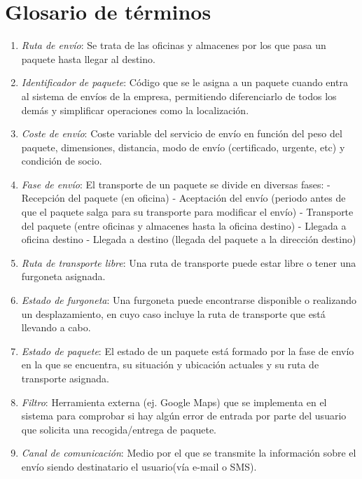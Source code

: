 \newpage

\section{Glosario de términos}
	\begin{enumerate}
		\item \textit{Ruta de envío}: Se trata de las oficinas y almacenes por los que pasa un paquete hasta llegar al destino.
		\item \textit{Identificador de paquete}: Código que se le asigna a un paquete cuando entra al sistema de envíos de la empresa, permitiendo diferenciarlo de todos los demás y simplificar operaciones como la localización.
		\item \textit{Coste de envío}: Coste variable del servicio de envío en función del peso del paquete, dimensiones, distancia, modo de envío (certificado, urgente, etc) y condición de socio.
		\item \textit{Fase de envío}: El transporte de un paquete se divide en diversas fases: \newline - Recepción del paquete (en oficina)
		\newline - Aceptación del envío (periodo antes de que el paquete salga para su transporte para modificar el envío)
		\newline - Transporte del paquete (entre oficinas y almacenes hasta la oficina destino)
		\newline - Llegada a oficina destino
		\newline - Llegada a destino (llegada del paquete a la dirección destino)
		\item \textit{Ruta de transporte libre}: Una ruta de transporte puede estar libre o tener una furgoneta asignada.
		\item \textit{Estado de furgoneta}: Una furgoneta puede encontrarse disponible o realizando un desplazamiento, en cuyo caso incluye la ruta de transporte que está llevando a cabo.
		\item \textit{Estado de paquete}: El estado de un paquete está formado por la fase de envío en la que se encuentra, su situación y ubicación actuales y su ruta de transporte asignada.
		\item \textit{Filtro}: Herramienta externa (ej. Google Maps) que se implementa  en el sistema para comprobar si hay algún error de entrada por parte del usuario que solicita una recogida/entrega de paquete.
		\item \textit{Canal de comunicación}: Medio por el que se transmite la información sobre el envío siendo destinatario el usuario(vía e-mail o SMS).

\end{enumerate}
